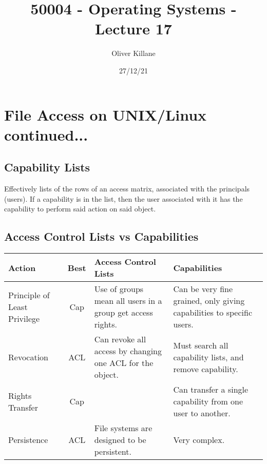 \documentclass{report}
\title{50004 - Operating Systems - Lecture 17}
\author{Oliver Killane}
\date{27/12/21}
\begin{document}
\maketitle
{}

\section*{File Access on UNIX/Linux continued...}
\subsection*{Capability Lists}
Effectively lists of the rows of an access matrix, associated with the principals (users). If a capability is in the list, then the user associated with it has the capability to perform said action on said object.
\subsection*{Access Control Lists vs Capabilities}
\begin{center}
	\begin{tabular}{p{} c p{} p{}}
		\textbf{Action}              & \textbf{Best} & \textbf{Access Control Lists}                              & \textbf{Capabilities}                                                 \\
		\hline
		Principle of Least Privilege & Cap           & Use of groups mean all users in a group get access rights. & Can be very fine grained, only giving capabilities to specific users. \\
		\hline
		Revocation                   & ACL           & Can revoke all access by changing one ACL for the object.  & Must search all capability lists, and remove capability.              \\
		\hline
		Rights Transfer              & Cap           &                                                            & Can transfer a single capability from one user to another.            \\
		\hline
		Persistence                  & ACL           & File systems are designed to be persistent.                & Very complex.                                                         \\
	\end{tabular}
\end{center}
\end{document}
